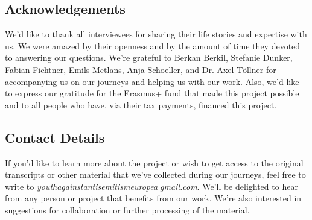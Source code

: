 \subsection*{Acknowledgements}
We’d like to thank all interviewees for sharing their life stories and expertise with us. We were amazed by their openness and by the amount of time they devoted to answering our questions. We're grateful to Berkan Berkil, Stefanie Dunker, Fabian Fichtner, Emils Metlans, Anja Schoeller, and Dr. Axel Töllner for accompanying us on our journeys and helping us with our work. Also, we'd like to express our gratitude for the Erasmus+ fund that made this project possible and to all people who have, via their tax payments, financed this project. 
\subsection*{Contact Details}
If you'd like to learn more about the project or wish to get access to the original transcripts or other material that we've collected during our journeys, feel free to write to \textit{youthagainstantisemitismeurope\textcircled{a}gmail.com}. We'll be delighted to hear from any person or project that benefits from our work. We're also interested in suggestions for collaboration or further processing of the material.
